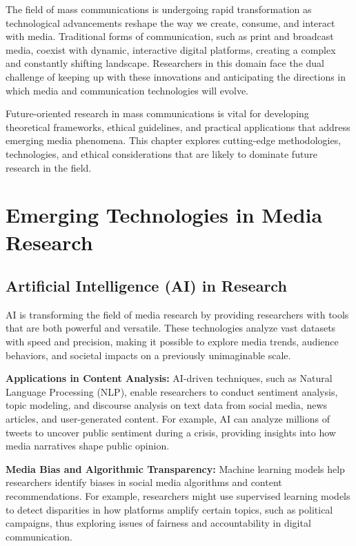 \documentclass[
]{book}
\begin{document}
The field of mass communications is undergoing rapid transformation as technological advancements reshape the way we create, consume, and interact with media. Traditional forms of communication, such as print and broadcast media, coexist with dynamic, interactive digital platforms, creating a complex and constantly shifting landscape. Researchers in this domain face the dual challenge of keeping up with these innovations and anticipating the directions in which media and communication technologies will evolve.

Future-oriented research in mass communications is vital for developing theoretical frameworks, ethical guidelines, and practical applications that address emerging media phenomena. This chapter explores cutting-edge methodologies, technologies, and ethical considerations that are likely to dominate future research in the field.

\section{Emerging Technologies in Media Research}\label{emerging-technologies-in-media-research}

\subsection{Artificial Intelligence (AI) in Research}\label{artificial-intelligence-ai-in-research}

AI is transforming the field of media research by providing researchers with tools that are both powerful and versatile. These technologies analyze vast datasets with speed and precision, making it possible to explore media trends, audience behaviors, and societal impacts on a previously unimaginable scale.

\textbf{Applications in Content Analysis:} AI-driven techniques, such as Natural Language Processing (NLP), enable researchers to conduct sentiment analysis, topic modeling, and discourse analysis on text data from social media, news articles, and user-generated content. For example, AI can analyze millions of tweets to uncover public sentiment during a crisis, providing insights into how media narratives shape public opinion.

\textbf{Media Bias and Algorithmic Transparency:} Machine learning models help researchers identify biases in social media algorithms and content recommendations. For example, researchers might use supervised learning models to detect disparities in how platforms amplify certain topics, such as political campaigns, thus exploring issues of fairness and accountability in digital communication.
\end{document}
